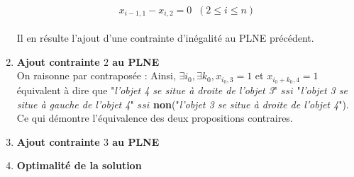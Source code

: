\documentclass[a4paper]{article}
\begin{document}
\begin{enumerate}
\[ x_{i-1,1} - x_{i,2} = 0 \;\; (2 \le i \le n)  \]
\\ Il en résulte l'ajout d'une contrainte d'inégalité au PLNE précédent.
\item \textbf{Ajout contrainte $2$ au PLNE}
\vspace{0.1cm}
\\ On raisonne par contraposée :  Ainsi, $\exists i_0, \exists k_0, x_{i_0,3} = 1$ et $x_{i_0 + k_0,4} = 1$
\\ équivalent à dire que "\textit{l'objet 4 se situe à droite de l'objet 3}" $ssi$ "\textit{l'objet 3 se situe à gauche de l'objet 4}" $ssi$ \textbf{non}("\textit{l'objet 3 se situe à droite de l'objet 4}"). 
\\ Ce qui démontre l'équivalence des deux propositions contraires.
\newpage
\item \textbf{Ajout contrainte $3$ au PLNE}
\vspace{0.1cm}

\item \textbf{Optimalité de la solution}
\vspace{0.1cm}

\end{enumerate}
\end{document}
